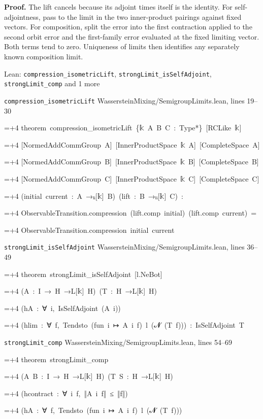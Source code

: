 \documentclass[11pt,a4paper]{report}
\newlength{\leancharwidth}
\newenvironment{leancode}{\par\smallskip\begingroup\ttfamily\footnotesize\raggedright
  \settowidth{\leancharwidth}{M}\setlength{\parskip}{0pt}\setlength{\parindent}{0pt}
  \frenchspacing}{\par\endgroup\smallskip}
\newcommand{\leanline}[2]{\hangindent=\dimexpr#1\leancharwidth+4\leancharwidth\relax
  \hangafter=1\noindent\hspace*{#1\leancharwidth}#2\par}
\newcommand{\leansource}[1]{\par{\footnotesize\color{leanmuted}#1}\par}
\begin{document}
\textbf{Proof.} The lift cancels because its adjoint times itself is the identity. For self-adjointness, pass to the limit in the two inner-product pairings against fixed vectors. For composition, split the error into the first contraction applied to the second orbit error and the first-family error evaluated at the fixed limiting vector. Both terms tend to zero. Uniqueness of limits then identifies any separately known composition limit.

\begin{leanbox}{Lean: \texttt{compression\_\allowbreak{}isometricLift}, \texttt{strongLimit\_\allowbreak{}isSelfAdjoint}, \texttt{strongLimit\_\allowbreak{}comp} and 1 more}
\leansource{\texttt{compression\_\allowbreak{}isometricLift} \quad WassersteinMixing/\allowbreak{}SemigroupLimits.lean, lines 19–30}
\begin{leancode}
\leanline{0}{theorem\ compression\_isometricLift\ \{{\leanfallback 𝕜}\ A\ B\ C\ :\ Type*\}\ [RCLike\ {\leanfallback 𝕜}]}
\leanline{4}{[NormedAddCommGroup\ A]\ [InnerProductSpace\ {\leanfallback 𝕜}\ A]\ [CompleteSpace\ A]}
\leanline{4}{[NormedAddCommGroup\ B]\ [InnerProductSpace\ {\leanfallback 𝕜}\ B]\ [CompleteSpace\ B]}
\leanline{4}{[NormedAddCommGroup\ C]\ [InnerProductSpace\ {\leanfallback 𝕜}\ C]\ [CompleteSpace\ C]}
\leanline{4}{(initial\ current\ :\ A\ →ₗᵢ[{\leanfallback 𝕜}]\ B)\ (lift\ :\ B\ →ₗᵢ[{\leanfallback 𝕜}]\ C)\ :}
\leanline{4}{ObservableTransition.compression\ (lift.comp\ initial)\ (lift.comp\ current)\ =}
\leanline{6}{ObservableTransition.compression\ initial\ current}
\end{leancode}
\leansource{\texttt{strongLimit\_\allowbreak{}isSelfAdjoint} \quad WassersteinMixing/\allowbreak{}SemigroupLimits.lean, lines 36–49}
\begin{leancode}
\leanline{0}{theorem\ strongLimit\_isSelfAdjoint\ [l.NeBot]}
\leanline{4}{(A\ :\ I\ →\ H\ →L[{\leanfallback 𝕜}]\ H)\ (T\ :\ H\ →L[{\leanfallback 𝕜}]\ H)}
\leanline{4}{(hA\ :\ ∀\ i,\ IsSelfAdjoint\ (A\ i))}
\leanline{4}{(hlim\ :\ ∀\ f,\ Tendsto\ (fun\ i\ ↦\ A\ i\ f)\ l\ ({\leanfallback 𝓝}\ (T\ f)))\ :\ IsSelfAdjoint\ T}
\end{leancode}
\leansource{\texttt{strongLimit\_\allowbreak{}comp} \quad WassersteinMixing/\allowbreak{}SemigroupLimits.lean, lines 54–69}
\begin{leancode}
\leanline{0}{theorem\ strongLimit\_comp}
\leanline{4}{(A\ B\ :\ I\ →\ H\ →L[{\leanfallback 𝕜}]\ H)\ (T\ S\ :\ H\ →L[{\leanfallback 𝕜}]\ H)}
\leanline{4}{(hcontract\ :\ ∀\ i\ f,\ ‖A\ i\ f‖\ ≤\ ‖f‖)}
\leanline{4}{(hA\ :\ ∀\ f,\ Tendsto\ (fun\ i\ ↦\ A\ i\ f)\ l\ ({\leanfallback 𝓝}\ (T\ f)))}

\end{leancode}
\end{leanbox}
\end{document}
